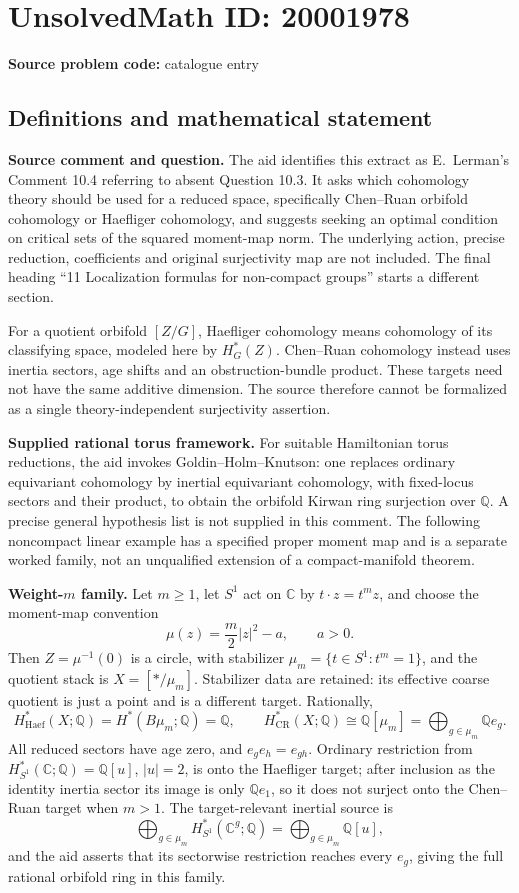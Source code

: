 \documentclass[11pt]{article}
\newcommand{\Q}{\mathbb{Q}}
\newcommand{\C}{\mathbb{C}}
\begin{document}
\section*{UnsolvedMath ID: 20001978}
\textbf{Source problem code:} catalogue entry
\subsection{Definitions and mathematical statement}
\textbf{Source comment and question.} The aid identifies this extract as E.~Lerman's Comment 10.4 referring to absent Question 10.3. It asks which cohomology theory should be used for a reduced space, specifically Chen--Ruan orbifold cohomology or Haefliger cohomology, and suggests seeking an optimal condition on critical sets of the squared moment-map norm. The underlying action, precise reduction, coefficients and original surjectivity map are not included. The final heading ``11 Localization formulas for non-compact groups'' starts a different section.

For a quotient orbifold $[Z/G]$, Haefliger cohomology means cohomology of its classifying space, modeled here by $H_G^*(Z)$. Chen--Ruan cohomology instead uses inertia sectors, age shifts and an obstruction-bundle product. These targets need not have the same additive dimension. The source therefore cannot be formalized as a single theory-independent surjectivity assertion.

\textbf{Supplied rational torus framework.} For suitable Hamiltonian torus reductions, the aid invokes Goldin--Holm--Knutson: one replaces ordinary equivariant cohomology by inertial equivariant cohomology, with fixed-locus sectors and their product, to obtain the orbifold Kirwan ring surjection over $\Q$. A precise general hypothesis list is not supplied in this comment. The following noncompact linear example has a specified proper moment map and is a separate worked family, not an unqualified extension of a compact-manifold theorem.

\textbf{Weight-$m$ family.} Let $m\ge1$, let $S^1$ act on $\C$ by $t\cdot z=t^m z$, and choose the moment-map convention
\[
 \mu(z)=\frac m2|z|^2-a,\qquad a>0.
\]
Then $Z=\mu^{-1}(0)$ is a circle, with stabilizer $\mu_m=\{t\in S^1:t^m=1\}$, and the quotient stack is $X=[*/\mu_m]$. Stabilizer data are retained: its effective coarse quotient is just a point and is a different target. Rationally,
\[
 H^*_{\mathrm{Haef}}(X;\Q)=H^*(B\mu_m;\Q)=\Q,
 \qquad H^*_{\mathrm{CR}}(X;\Q)\cong\Q[\mu_m]
       =\bigoplus_{g\in\mu_m}\Q e_g.
\]
All reduced sectors have age zero, and $e_ge_h=e_{gh}$. Ordinary restriction from $H^*_{S^1}(\C;\Q)=\Q[u]$, $|u|=2$, is onto the Haefliger target; after inclusion as the identity inertia sector its image is only $\Q e_1$, so it does not surject onto the Chen--Ruan target when $m>1$. The target-relevant inertial source is
\[
 \bigoplus_{g\in\mu_m}H^*_{S^1}(\C^g;\Q)
 =\bigoplus_{g\in\mu_m}\Q[u],
\]
and the aid asserts that its sectorwise restriction reaches every $e_g$, giving the full rational orbifold ring in this family.
\end{document}
